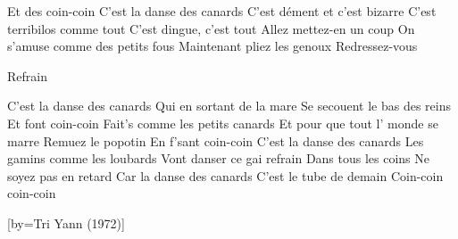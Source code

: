Et des coin-coin
C'est la danse des canards
C'est dément et c'est bizarre
C'est terribilos comme tout
C'est dingue, c'est tout
Allez mettez-en un coup
On s'amuse comme des petits fous
Maintenant pliez les genoux
Redressez-vous
\endverse

\beginverse
Refrain
\endverse

\beginverse
C'est la danse des canards
Qui en sortant de la mare
Se secouent le bas des reins
Et font coin-coin
Fait's comme les petits canards
Et pour que tout l' monde se marre
Remuez le popotin
En f'sant coin-coin
C'est la danse des canards
Les gamins comme les loubards
Vont danser ce gai refrain
Dans tous les coins
Ne soyez pas en retard
Car la danse des canards
C'est le tube de demain
Coin-coin coin-coin
\endverse

\endsong
{}[by={Tri Yann (1972)}]

\]\]\]\]\]\]\]\]\]\]\]\]\]\]\]\]\]\]\]\]\]\]\]\]\]\]\]\]\]\]\]\]\]\]\]\]\]\]\]\]\]\]\]\]\]\]\]\]\]\]\]\]\]\]\]\]\]\]\]\]\]\]\]\]\]\]\]\]\]\]\]\]\]\]\]\]\]\]\]\]\]\]\]\]\]\]\]\]\]\]\]\]\]\]\]\]\]\]\]\]\]\]\]\]\]\]\]\]\]\]\]\]\]\]\]\]\]\]\]\]\]\]\]\]\]\]\]\]\]\]\]\]\]\]\]\]\]\]\]\]\]\]\]\]\]\]\]\]\]\]\]\]\]\]\]\]\]\]\]\]\]\]\]\]\]\]\]\]\]\]\]\]\]\]\]\]\]\]\]\]\]\]\]\]\]\]\]\]\]\]\]\]\]\]\]\]\]\]\]\]\]\]\]\]\]\]\]\]\]\]\]\]\]\]\]\]\]\]\]\]\]\]\]\]\]\]\]\]\]\]\]\]\]\]\]\]\]\]\]\]\]\]\]\]\]\]\]\]\]\]\]\]\]\]\]\]\]\]\]\]\]\]\]\]\]\]\]\]\]\]\]\]\]\]\]\]\]\]\]\]\]\]\]\]\]\]\]\]\]\]\]\]\]\]\]\]\]\]\]\]\]\]\]\]\]\]\]\]\]\]\]\]\]\]\]\]\]\]\]\]\]\]\]\]\]\]\]\]\]\]\]\]\]\]\]\]\]\]\]\]\]\]\]\]\]\]\]\]\]\]\]\]\]\]\]\]\]\]\]\]\]\]\]\]\]\]\]\]\]\]\]\]\]\]\]\]\]\]\]\]\]\]\]\]\]\]\]\]\]\]\]\]\]\]\]\]\]\]\]\]\]\]\]\]\]\]\]\]\]\]\]\]\]\]\]\]\]\]\]\]\]\]\]\]\]\]\]\]\]\]\]\]\]\]\]\]\]\]\]\]\]\]\]\]\]\]\]\]\]\]\]\]\]\]\]\]\]\]\]\]\]\]\]\]\]\]\]\]\]\]\]\]\]\]\]\]\]\]\]\]\]\]\]\]\]\]\]\]\]\]\]\]\]\]\]\]\]\]\]\]\]\]\]\]\]\]\]\]\]\]\]\]\]\]\]\]\]\]\]\]\]\]\]\]\]\]\]\]\]\]\]\]\]\]\]\]\]\]\]\]\]\]\]\]\]\]\]\]\]\]\]\]\]\]\]\]\]\]\]\]\]\]\]\]\]\]\]\]\]\]\]\]\]\]\]\]\]\]\]\]\]\]\]\]\]\]\]\]\]\]\]\]\]\]\]\]\]\]\]\]\]\]\]\]\]\]\]\]\]\]\]\]\]\]\]\]\]\]\]\]\]\]\]\]\]\]\]\]\]\]\]\]\]\]\]\]\]\]\]\]\]\]\]\]\]\]\]\]\]\]\]\]\]\]\]\]\]\]\]\]\]\]\]\]\]\]\]\]\]\]\]\]\]\]\]\]\]\]\]\]\]\]\]\]\]\]\]\]\]\]\]\]\]\]\]\]\]\]\]\]\]\]\]\]\]\]\]\]\]\]\]\]\]\]\]\]\]\]\]\]\]\]\]\]\]\]\]\]\]\]\]\]\]\]\]\]\]\]\]\]\]\]\]\]\]\]\]\]\]\]\]\]\]\]\]\]\]\]\]\]\]\]\]\]\]\]\]\]\]\]\]\]\]\]\]\]\]\]\]\]\]\]\]\]\]\]\]\]\]\]\]\]\]\]\]\]\]\]\]\]\]\]\]\]\]\]\]\]\]\]\]\]\]\]\]\]\]\]\]\]\]\]\]\]\]\]\]\]\]\]\]\]\]\]\]\]\]\]\]\]\]\]\]\]\]\]\]\]\]\]\]\]\]\]\]\]\]\]\]\]\]\]\]\]\]\]\]\]\]\]\]\]\]\]\]\]\]\]\]\]\]\]\]\]\]\]\]\]\]\]\]\]\]\]\]\]\]\]\]\]\]\]\]\]\]\]\]\]\]\]\]\]\]\]\]\]\]\]\]\]\]\]\]\]\]\]\]\]\]\]\]\]\]\]\]\]\]\]\]\]\]\]\]\]\]\]\]\]\]\]\]\]\]\]\]\]\]\]\]\]\]\]\]\]\]\]\]\]\]\]\]\]\]\]\]\]\]\]\]\]\]\]\]\]\]\]\]\]\]\]\]\]\]\]\]\]\]\]\]\]\]\]\]\]\]\]\]\]\]\]\]\]\]\]\]\]\]\]\]\]\]\]\]\]\]\]\]\]\]\]\]\]\]\]\]\]\]\]\]\]\]\]\]\]\]\]\]\]\]\]\]\]\]\]\]\]\]\]\]\]\]\]\]\]\]\]\]\]\]\]\]\]\]\]\]\]\]\]\]\]\]\]\]\]\]\]\]\]\]\]\]\]\]\]\]\]\]\]\]\]\]\]\]\]\]\]\]\]\]\]\]\]\]\]\]\]\]\]\]\]\]\]\]\]\]\]\]\]\]\]\]\]\]\]\]\]\]\]\]\]\]\]\]\]\]\]\]\]\]\]\]\]\]\]\]\]\]\]\]\]\]\]\]\]\]\]\]\]\]\]\]\]\]\]\]\]\]\]\]\]\]\]\]\]\]\]\]\]\]\]\]\]\]\]\]\]\]\]\]\]\]\]\]\]\]\]\]\]\]\]\]\]\]\]\]\]\]\]
